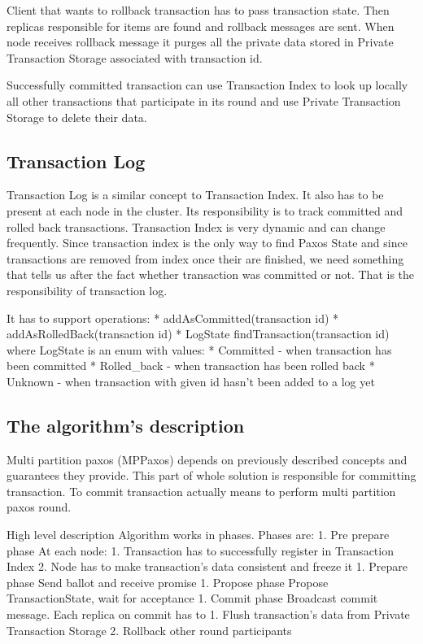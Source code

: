 Client that wants to rollback transaction has to pass transaction state. Then replicas responsible for items are found and rollback messages are sent. When node receives rollback message it purges all the private data stored in Private Transaction Storage associated with transaction id.


Successfully committed transaction can use Transaction Index to look up locally all other transactions that participate in its round and use Private Transaction Storage to delete their data.


\subsection{Transaction Log}
Transaction Log is a similar concept to Transaction Index. It also has to be present at each node in the cluster. Its responsibility is to track committed and rolled back transactions. Transaction Index is very dynamic and can change frequently. Since transaction index is the only way to find Paxos State and since transactions are removed from index once their are finished, we need something that tells us after the fact whether transaction was committed or not. That is the responsibility of transaction log.


It has to support operations:
* addAsCommitted(transaction id)
* addAsRolledBack(transaction id)
* LogState findTransaction(transaction id) where LogState is an enum with values: 
   * Committed - when transaction has been committed
   * Rolled_back - when transaction has been rolled back
   * Unknown - when transaction with given id hasn’t been added to a log yet


\subsection{The algorithm's description}
Multi partition paxos (MPPaxos) depends on previously described concepts and guarantees they provide. This part of whole solution is responsible for committing transaction. To commit transaction actually means to perform multi partition paxos round. 


        High level description
Algorithm works in phases. Phases are:
1. Pre prepare phase
At each node:
   1. Transaction has to successfully register in Transaction Index
   2. Node has to make transaction’s data consistent and freeze it
1. Prepare phase
Send ballot and receive promise
1. Propose phase
Propose TransactionState, wait for acceptance
1. Commit phase
        Broadcast commit message. Each replica on commit has to
   1. Flush transaction’s data from Private Transaction Storage
   2. Rollback other round participants
        
